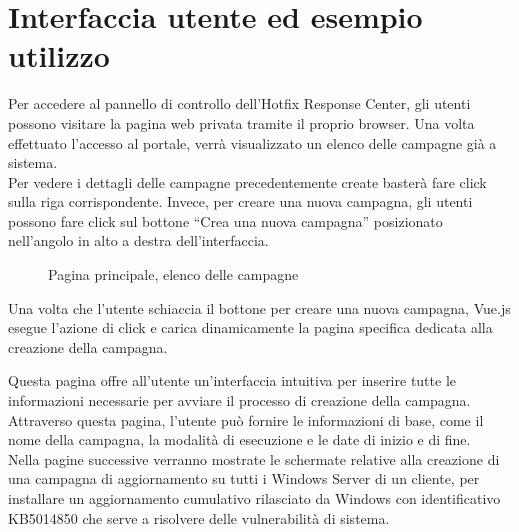 \section{Interfaccia utente ed esempio utilizzo}
Per accedere al pannello di controllo dell’Hotfix Response Center, gli utenti 
possono visitare la pagina web privata tramite il proprio browser. 
Una volta effettuato l'accesso al portale, verrà visualizzato un elenco delle 
campagne già a sistema.\\

Per vedere i dettagli delle campagne precedentemente create basterà fare click 
sulla riga corrispondente. Invece, per creare una nuova campagna, gli utenti 
possono fare click sul bottone “Crea una nuova campagna” posizionato nell'angolo 
in alto a destra dell’interfaccia.

\begin{figure}[H]
\begin{flushright}
    \centering
    \caption{Pagina principale, elenco delle campagne}
    \label{fig:Elenco delle campagne}
\end{flushright}
\end{figure}

Una volta che l'utente schiaccia il bottone per creare una nuova campagna, Vue.js 
esegue l'azione di click e carica dinamicamente la pagina specifica dedicata alla 
creazione della campagna. 

Questa pagina offre all'utente un'interfaccia intuitiva per inserire tutte 
le informazioni necessarie per avviare il processo di creazione 
della campagna. Attraverso questa pagina, l'utente può fornire le informazioni di base, 
come il nome della campagna, la modalità di esecuzione e le date di inizio e di 
fine.\\

Nella pagine successive verranno mostrate le schermate relative alla creazione di 
una campagna di aggiornamento su tutti i Windows Server di un cliente, per installare
un aggiornamento cumulativo rilasciato da Windows con identificativo KB5014850 che
serve a risolvere delle vulnerabilità di sistema.

